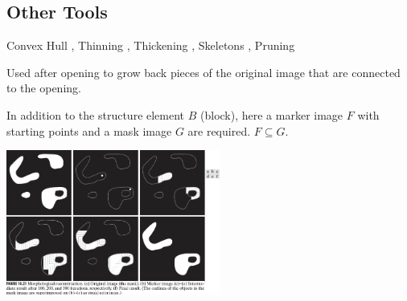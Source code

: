   \begin{minipage}{11.5cm}
    \subsection{Other Tools} 
      Convex Hull , Thinning , Thickening , 
      Skeletons , Pruning 
      
      Used after opening to grow back pieces of the original image that are connected to the opening.
      
      In addition to the structure element $B$ (block), here a marker image $F$ with starting points and a 
      mask image $G$ are required. $F \subseteq G$. 
  \end{minipage}
  \hspace{0.5cm}
  \begin{minipage}{7cm}
    \begin{flushright}
      \includegraphics[width=7cm]{./images/morphology_reconstruction.png}
    \end{flushright}
  \end{minipage}
  \vspace{0.5em}
  
